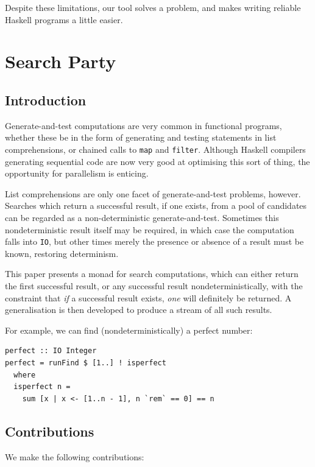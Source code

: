 Despite these limitations, our tool solves a problem, and makes
writing reliable Haskell programs a little easier.

\section{Search Party}
\label{sec:prelims-searchparty}

\subsection{Introduction}
\label{sec:prelims-searchparty-intro}

Generate-and-test computations are very common in functional programs,
whether these be in the form of generating and testing statements in
list comprehensions, or chained calls to \verb|map| and
\verb|filter|. Although Haskell compilers generating sequential code
are now very good at optimising this sort of thing, the opportunity
for parallelism is enticing.

List comprehensions are only one facet of generate-and-test problems,
however. Searches which return a successful result, if one exists,
from a pool of candidates can be regarded as a non-deterministic
generate-and-test. Sometimes this nondeterministic result itself may
be required, in which case the computation falls into \verb|IO|, but
other times merely the presence or absence of a result must be known,
restoring determinism.

This paper presents a monad for search computations, which can either
return the first successful result, or any successful result
nondeterministically, with the constraint that \textit{if} a
successful result exists, \textit{one} will definitely be returned. A
generalisation is then developed to produce a stream of all such
results.

For example, we can find (nondeterministically) a perfect number:

\begin{verbatim}
perfect :: IO Integer
perfect = runFind $ [1..] ! isperfect
  where
  isperfect n =
    sum [x | x <- [1..n - 1], n `rem` == 0] == n
\end{verbatim}

\subsection*{Contributions}

We make the following contributions:

